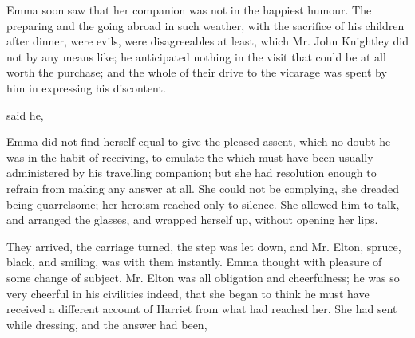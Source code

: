 Emma soon saw that her companion was not in the happiest humour. The preparing and the going abroad in such weather, with the sacrifice of his children after dinner, were evils, were disagreeables at least, which Mr. John Knightley did not by any means like; he anticipated nothing in the visit that could be at all worth the purchase; and the whole of their drive to the vicarage was spent by him in expressing his discontent.

 said he, 

Emma did not find herself equal to give the pleased assent, which no doubt he was in the habit of receiving, to emulate the  which must have been usually administered by his travelling companion; but she had resolution enough to refrain from making any answer at all. She could not be complying, she dreaded being quarrelsome; her heroism reached only to silence. She allowed him to talk, and arranged the glasses, and wrapped herself up, without opening her lips.

They arrived, the carriage turned, the step was let down, and Mr. Elton, spruce, black, and smiling, was with them instantly. Emma thought with pleasure of some change of subject. Mr. Elton was all obligation and cheerfulness; he was so very cheerful in his civilities indeed, that she began to think he must have received a different account of Harriet from what had reached her. She had sent while dressing, and the answer had been, 

